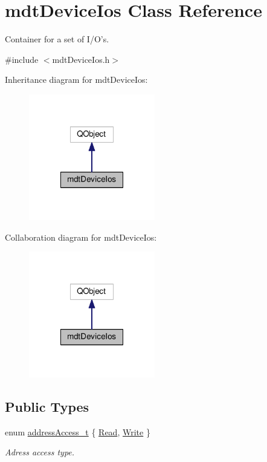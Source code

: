 \hypertarget{classmdt_device_ios}{\section{mdt\-Device\-Ios Class Reference}
\label{classmdt_device_ios}
}


Container for a set of I/\-O's.  




{\ttfamily \#include $<$mdt\-Device\-Ios.\-h$>$}



Inheritance diagram for mdt\-Device\-Ios\-:
\nopagebreak
\begin{figure}[H]
\begin{center}
\leavevmode
\includegraphics[width=156pt]{classmdt_device_ios__inherit__graph}
\end{center}
\end{figure}


Collaboration diagram for mdt\-Device\-Ios\-:
\nopagebreak
\begin{figure}[H]
\begin{center}
\leavevmode
\includegraphics[width=156pt]{classmdt_device_ios__coll__graph}
\end{center}
\end{figure}
\subsection*{Public Types}
\begin{DoxyCompactItemize}
\item 
enum \hyperlink{classmdt_device_ios_a72fc3fdcd905d669b1e90496e808d6dd}{address\-Access\-\_\-t} \{ \hyperlink{classmdt_device_ios_a72fc3fdcd905d669b1e90496e808d6dda69811abe027fb5c9c22cf99034ef626b}{Read}, 
\hyperlink{classmdt_device_ios_a72fc3fdcd905d669b1e90496e808d6dda29a5b11f060f7fce671b9ced4bb4ef7a}{Write}
 \}
\begin{DoxyCompactList}\small\item\em Adress access type. \end{DoxyCompactList}\end{DoxyCompactItemize}

